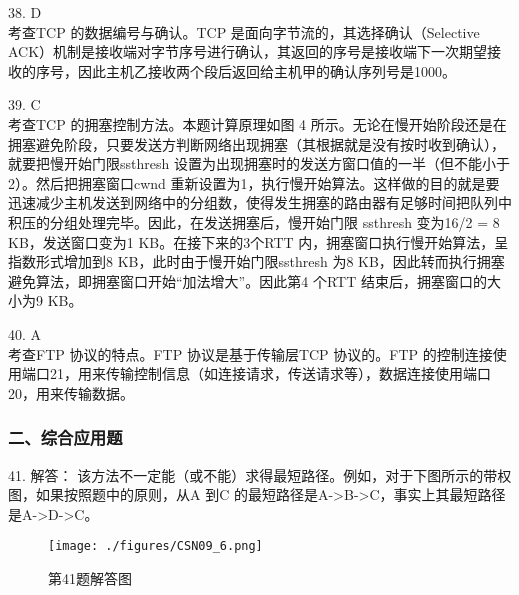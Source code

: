 38. D \\
考查TCP 的数据编号与确认。TCP 是面向字节流的，其选择确认（Selective ACK）机制是接收端对字节序号进行确认，其返回的序号是接收端下一次期望接收的序号，因此主机乙接收两个段后返回给主机甲的确认序列号是1000。

39. C \\
考查TCP 的拥塞控制方法。本题计算原理如图 4 所示。无论在慢开始阶段还是在拥塞避免阶段，只要发送方判断网络出现拥塞（其根据就是没有按时收到确认），就要把慢开始门限ssthresh 设置为出现拥塞时的发送方窗口值的一半（但不能小于2）。然后把拥塞窗口cwnd 重新设置为1，执行慢开始算法。这样做的目的就是要迅速减少主机发送到网络中的分组数，使得发生拥塞的路由器有足够时间把队列中积压的分组处理完毕。因此，在发送拥塞后，慢开始门限 ssthresh 变为16/2 = 8 KB，发送窗口变为1 KB。在接下来的3个RTT 内，拥塞窗口执行慢开始算法，呈指数形式增加到8 KB，此时由于慢开始门限ssthresh 为8 KB，因此转而执行拥塞避免算法，即拥塞窗口开始“加法增大”。因此第4 个RTT 结束后，拥塞窗口的大小为9 KB。

40. A \\
考查FTP 协议的特点。FTP 协议是基于传输层TCP 协议的。FTP 的控制连接使用端口21，用来传输控制信息（如连接请求，传送请求等），数据连接使用端口20，用来传输数据。

\subsubsection{二、综合应用题}
41. 解答：
该方法不一定能（或不能）求得最短路径。例如，对于下图所示的带权图，如果按照题中的原则，从A 到C 的最短路径是A->B->C，事实上其最短路径是A->D->C。
\begin{figure}[ht]
\centering
\texttt{[image: ./figures/CSN09\_6.png]}
\caption{第41题解答图} \label{CSN09_fig6}
\end{figure}

